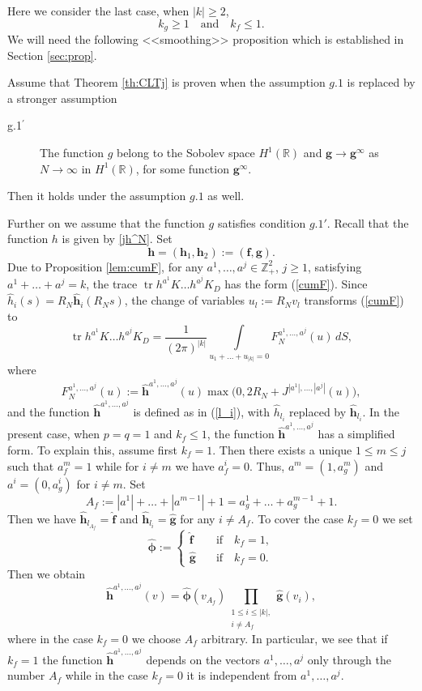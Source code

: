 \documentclass{article}
\numberwithin{equation}{section}
\newcommand{\mR}{\mathbb{R}}
\newcommand{\mZ}{\mathbb{Z}}
\newcommand{\tr}{\operatorname{tr}}
\newcommand{\ra}{\rightarrow}
\newcommand{\fr}{\frac}
\newcommand{\qnd}{\quad\mbox{and}\quad}
\newcommand{\ili}{\int\limits}
\newcommand{\lbl}{\label}
\newcommand{\rprop}{Proposition \nolinebreak}
\newcommand{\rtheo}{Theorem \nolinebreak}
\newcommand{\rsec}{Section \nolinebreak}
\newcommand{\bee}{\begin{equation}}
\newcommand{\eee}{\end{equation}}
\newcommand{\sck}{\substack}
\begin{document}
Here we consider the last case,
when $|k|\geq 2$,
\bee\lbl{case4}
k_g\geq 1 \qnd k_f\leq 1.
\eee
We will need the following
<<smoothing>> proposition which is 
established in
\rsec\ref{sec:prop}.
\begin{prop}
	\lbl{lem:smoothing}
	Assume that \rtheo\ref{th:CLTj}
	is proven when the assumption $g.1$
	is replaced by a
	stronger assumption
	\begin{description}
		\item[g.1$^{\bm\prime}$]
		The function $g$ belong to the
		Sobolev space $H^1(\mR)$
		and $\bm g\ra\bm g^\infty$ as $N\ra\infty$
		in $H^1(\mR)$, for some function $\bm g^\infty$.
	\end{description}
	Then it holds under the
	assumption  $g.1$
	as well.
\end{prop}
Further on we assume that the function $g$
satisfies condition $g.1'$.
Recall that the function $h$ is given by \eqref{jh^N}.
Set
$$
\bm h=(\bm h_1,\bm h_2):=(\bm f,\bm g). 
$$
Due to \rprop \ref{lem:cumF},
for any $a^1,\ldots,a^j\in\mZ^2_+$, $j\geq 1$,
satisfying $a^1+\ldots+a^j=k$,
the trace
$\tr h^{a^1}K\ldots h^{a^j}K_{D}$
has the form (\ref{cumF}).
Since $\hat h_i(s)=R_N\hat{\bm h}_i(R_Ns)$, the change of variables $u_l:=R_Nv_l$ transforms
(\ref{cumF}) to
\bee\lbl{1Bk}
\tr h^{a^1}K\ldots h^{a^j}K_{D} =
\fr{1}{(2\pi)^{|k|}}\ili_{u_1+\ldots+ u_{|k|}=0} F_N^{a^1,\ldots,a^j}(u)  \, dS,
\eee
where
\bee\lbl{jF}
F_N^{a^1,\ldots,a^j}(u):=
\hat {\bm h}^{a^1,\ldots,a^j}(u)
\max\big(0, 2R_N + J^{|a^1|,\ldots,|a^j|}(u)\big),
\eee
and the function $\hat {\bm h}^{a^1,\ldots,a^j}$ is defined as in (\ref{l_i}),
with $\hat h_{l_i}$ replaced by $\hat {\bm h}_{l_i}$.
In the present case, when $p=q=1$ and $k_f\leq 1$, the function 
$\hat {\bm h}^{a^1,\ldots,a^j}$ 
has a simplified form. 
To explain this, assume first 
$k_f=1$. 
Then there exists a unique $1\leq m\leq j$ such that $a_f^m=1$ while for $i\neq m$ we have $a_f^i=0$. 
Thus, $a^m=(1,a_g^m)$ 
and $a^i=(0,a_g^i)$ for $i\neq m$.
Set 
$$
A_f:=|a^1|+\ldots + |a^{m-1}|+1=a_g^1+\ldots+a_g^{m-1}+1.
$$
Then we have
$\hat {\bm h}_{l_{A_f}}=\hat {\bm f}$
and
$
\hat {\bm h}_{l_i}=\hat {\bm g}
$
for any $i\neq A_f$.
To cover the case $k_f=0$ we set 
\bee\lbl{hat_phi}
\hat{\bm \phi}:=
\left\{
\begin{array}{cl}
	\hat{\bm f} \quad&\mbox{if}\quad k_f=1, \\
	\hat{\bm g} \quad&\mbox{if}\quad k_f=0.
\end{array}
\right.
\eee
Then we obtain
\bee\lbl{hsimple}
\hat {\bm h}^{a^1,\ldots,a^j}(v)=
\hat{\bm \phi}(v_{A_f})\prod
\limits_{\sck{1\leq i \leq |k|,\\i\neq A_f }}
\hat{\bm g}(v_i),
\eee
where in the case $k_f=0$ we choose $A_f$ arbitrary. 
In particular, we see that if $k_f=1$ the function
$\hat {\bm h}^{a^1,\ldots,a^j}$
depends on the vectors $a^1,\ldots,a^j$ 
only through the number $A_f$ while in the case $k_f=0$ it is independent from $a^1,\ldots,a^j$.
\end{document}
